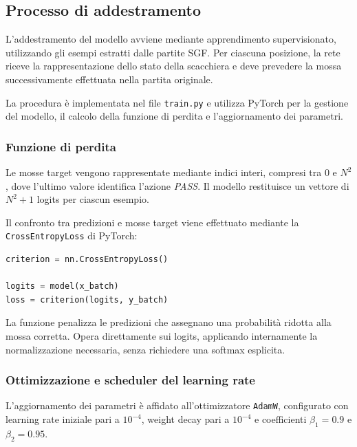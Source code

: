 \subsection{Processo di addestramento}

L'addestramento del modello avviene mediante apprendimento supervisionato, utilizzando gli esempi estratti dalle partite SGF. Per ciascuna posizione, la rete riceve la rappresentazione dello stato della scacchiera e deve prevedere la mossa successivamente effettuata nella partita originale.

La procedura è implementata nel file \texttt{train.py} e utilizza PyTorch per la gestione del modello, il calcolo della funzione di perdita e l'aggiornamento dei parametri.

\subsubsection{Funzione di perdita}

Le mosse target vengono rappresentate mediante indici interi, compresi tra \(0\) e \(N^2\), dove l'ultimo valore identifica l'azione \textit{PASS}. Il modello restituisce un vettore di \(N^2+1\) logits per ciascun esempio.

Il confronto tra predizioni e mosse target viene effettuato mediante la \texttt{CrossEntropyLoss} di PyTorch:

\begin{lstlisting}[language=Python, caption={Definizione della funzione di perdita}, label={lst:training_loss}]
criterion = nn.CrossEntropyLoss()

logits = model(x_batch)
loss = criterion(logits, y_batch)
\end{lstlisting}

La funzione penalizza le predizioni che assegnano una probabilità ridotta alla mossa corretta. Opera direttamente sui logits, applicando internamente la normalizzazione necessaria, senza richiedere una softmax esplicita.

\subsubsection{Ottimizzazione e scheduler del learning rate}

L'aggiornamento dei parametri è affidato all'ottimizzatore \texttt{AdamW}, configurato con learning rate iniziale pari a \(10^{-4}\), weight decay pari a \(10^{-4}\) e coefficienti \(\beta_1=0.9\) e \(\beta_2=0.95\).

